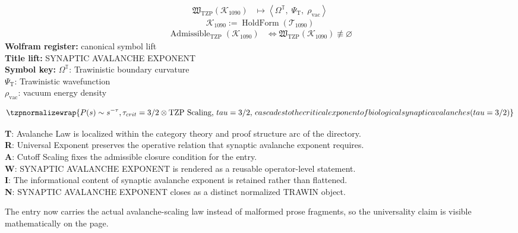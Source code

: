 \noindent
\begin{minipage}[t]{0.48\linewidth}
\begingroup
\small
\[
\begin{aligned}
\mathfrak{W}_{\mathrm{TZP}}\!\left(\mathcal{K}_{1090}\right)
&\longmapsto
\left\langle \Omega^{\mathbb{T}},\; \Psi_{\mathrm{T}},\; \rho_{\mathrm{vac}} \right\rangle
\end{aligned}
\]
\[
\mathcal{K}_{1090}
:=
\operatorname{HoldForm}\!\left(\mathcal{T}_{1090}\right)
\]
\[
\begin{aligned}
\operatorname{Admissible}_{\mathrm{TZP}}\!\left(\mathcal{K}_{1090}\right)
&\Longleftrightarrow
\mathfrak{W}_{\mathrm{TZP}}\!\left(\mathcal{K}_{1090}\right)\not\equiv\varnothing
\end{aligned}
\]
\textbf{Wolfram register:} canonical symbol lift\\
\textbf{Title lift:} SYNAPTIC AVALANCHE EXPONENT\\
\textbf{Symbol key:} \(\Omega^{\mathbb{T}}\): Trawinistic boundary curvature\\ \(\Psi_{\mathrm{T}}\): Trawinistic wavefunction\\ \(\rho_{\mathrm{vac}}\): vacuum energy density
\par
\endgroup
\end{minipage}\hfill
\begin{minipage}[t]{0.48\linewidth}
\[
\tzpnormalizewrap{P(s) \sim s^{-\tau}, \tau_{crit} = 3/2 \otimes \text{TZP Scaling},\,tau=3/2,\,cascades to the critical exponent of biological synaptic avalanches (tau=3/2)}
\]

\small
\textbf{T}: Avalanche Law is localized within the category theory and proof structure arc of the directory.\\
\textbf{R}: Universal Exponent preserves the operative relation that synaptic avalanche exponent requires.\\
\textbf{A}: Cutoff Scaling fixes the admissible closure condition for the entry.\\
\textbf{W}: SYNAPTIC AVALANCHE EXPONENT is rendered as a reusable operator-level statement.\\
\textbf{I}: The informational content of synaptic avalanche exponent is retained rather than flattened.\\
\textbf{N}: SYNAPTIC AVALANCHE EXPONENT closes as a distinct normalized TRAWIN object.
\normalsize
\end{minipage}

The entry now carries the actual avalanche-scaling law instead of malformed prose fragments, so the universality claim is visible mathematically on the page.
\clearpage

